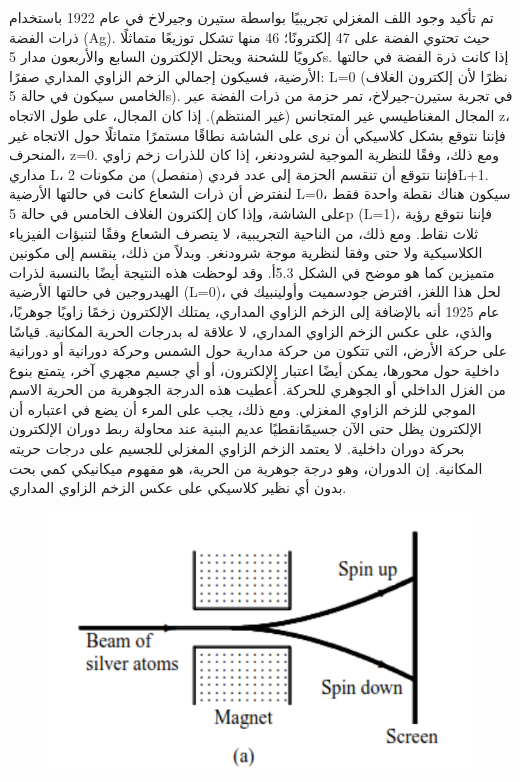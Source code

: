 تم تأكيد وجود اللف المغزلي تجريبيًا بواسطة ستيرن وجيرلاخ في عام 1922 باستخدام ذرات الفضة (Ag). حيث تحتوي الفضة على 47 إلكترونًا؛ 46 منها تشكل توزيعًا متماثلًا كرويًا للشحنة ويحتل الإلكترون السابع والأربعون مدار 5s. إذا كانت ذرة الفضة في حالتها الأرضية، فسيكون إجمالي الزخم الزاوي المداري صفرًا: L=0 (نظرًا لأن إلكترون الغلاف الخامس سيكون في حالة 5s). في تجربة ستيرن-جيرلاخ، تمر حزمة من ذرات الفضة عبر المجال المغناطيسي غير المتجانس (غير المنتظم). إذا كان المجال، على طول الاتجاه z، فإننا نتوقع بشكل كلاسيكي أن نرى على الشاشة نطاقًا مستمرًا متماثلًا حول الاتجاه غير المنحرف، z=0. ومع ذلك، وفقًا للنظرية الموجية لشرودنغر، إذا كان للذرات زخم زاوي مداري L، فإننا نتوقع أن تنقسم الحزمة إلى عدد فردي (منفصل) من مكونات 2L+1. لنفترض أن ذرات الشعاع كانت في حالتها الأرضية L=0، سيكون هناك نقطة واحدة فقط على الشاشة، وإذا كان إلكترون الغلاف الخامس في حالة 5p (L=1)، فإننا نتوقع رؤية ثلاث نقاط. ومع ذلك، من الناحية التجريبية، لا يتصرف الشعاع وفقًا لتنبؤات الفيزياء الكلاسيكية ولا حتى وفقا لنظرية موجة شرودنغر. وبدلاً من ذلك، ينقسم إلى مكونين متميزين كما 
هو موضح في الشكل 5.3أ. وقد لوحظت هذه النتيجة أيضًا بالنسبة لذرات الهيدروجين في حالتها الأرضية (L=0)، لحل هذا اللغز، افترض جودسميت وأولينبيك في عام 1925 أنه بالإضافة إلى الزخم الزاوي المداري، يمتلك الإلكترون زخمًا زاويًا جوهريًا، والذي، على عكس الزخم الزاوي المداري، لا علاقة له بدرجات الحرية المكانية. قياسًا على حركة الأرض، التي تتكون من حركة مدارية حول الشمس وحركة دورانية أو دورانية داخلية حول محورها، يمكن أيضًا اعتبار الإلكترون، أو أي جسيم مجهري آخر، يتمتع بنوع من الغزل الداخلي أو الجوهري للحركة. أُعطيت هذه الدرجة الجوهرية من الحرية الاسم الموجي للزخم الزاوي المغزلي. ومع ذلك، يجب على المرء أن يضع في اعتباره أن الإلكترون يظل حتى الآن جسيمًانقطيًا عديم البنية  عند محاولة ربط دوران الإلكترون بحركة دوران داخلية. لا يعتمد الزخم الزاوي المغزلي للجسيم على درجات حريته المكانية. إن الدوران، وهو درجة جوهرية من الحرية، هو مفهوم ميكانيكي كمي بحت بدون أي نظير كلاسيكي على عكس الزخم الزاوي المداري.
\begin{figure}[h]
	\centering
	\includegraphics[width=0.7\linewidth, height=0.23\textheight]{"Fig/Fig_III/Ag atome"}
	\caption{}
	\label{fig:ag-atome}
\end{figure}


